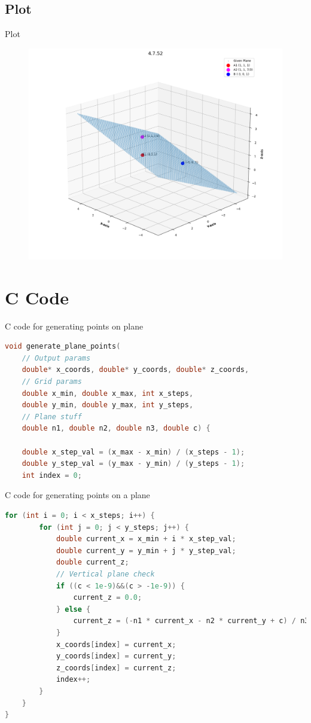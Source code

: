 \documentclass{beamer}
\theoremstyle{remark}
\numberwithin{equation}{section}
\begin{document}
\subsection{Plot}
\begin{frame}{Plot}
 \begin{figure}[H]
    \centering
    \includegraphics[width=0.8\columnwidth]{../figs/plot.png}
    \caption*{}
    \label{fig:plot}
\end{figure}
\end{frame}

\section{C Code}
\begin{frame}[fragile]{C code for generating points on plane}
\begin{lstlisting}[language=C]
 void generate_plane_points(
    // Output params
    double* x_coords, double* y_coords, double* z_coords,
    // Grid params
    double x_min, double x_max, int x_steps,
    double y_min, double y_max, int y_steps,
    // Plane stuff
    double n1, double n2, double n3, double c) {

    double x_step_val = (x_max - x_min) / (x_steps - 1);
    double y_step_val = (y_max - y_min) / (y_steps - 1);
    int index = 0;
\end{lstlisting}
\end{frame}
\begin{frame}[fragile]{C code for generating points on a plane}
\begin{lstlisting}[language=C]
    for (int i = 0; i < x_steps; i++) {
        for (int j = 0; j < y_steps; j++) {
            double current_x = x_min + i * x_step_val;
            double current_y = y_min + j * y_step_val;
            double current_z;
            // Vertical plane check
            if ((c < 1e-9)&&(c > -1e-9)) {
                current_z = 0.0;
            } else {
                current_z = (-n1 * current_x - n2 * current_y + c) / n3;
            }
            x_coords[index] = current_x;
            y_coords[index] = current_y;
            z_coords[index] = current_z;
            index++;
        }
    }
}
\end{lstlisting}
\end{frame}
\end{document}
